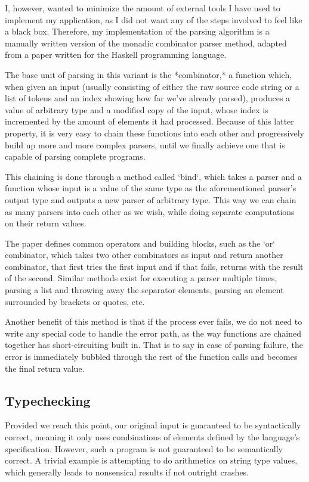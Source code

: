 \documentclass[conference]{IEEEtran}
\begin{document}
I, however, wanted to minimize the amount of external tools I have used to implement my application, as I did not want any of the steps involved to feel like a black box. Therefore, my implementation of the parsing algorithm is a manually written version of the monadic combinator parser method, adapted from a paper written for the Haskell programming language.

The base unit of parsing in this variant is the *combinator,* a function which, when given an input (usually consisting of either the raw source code string or a list of tokens and an index showing how far we've already parsed), produces a value of arbitrary type and a modified copy of the input, whose index is incremented by the amount of elements it had processed. Because of this latter property, it is very easy to chain these functions into each other and progressively build up more and more complex parsers, until we finally achieve one that is capable of parsing complete programs.

This chaining is done through a method called `bind`, which takes a parser and a function whose input is a value of the same type as the aforementioned parser's output type and outputs a new parser of arbitrary type. This way we can chain as many parsers into each other as we wish, while doing separate computations on their return values.

The paper defines common operators and building blocks, such as the `or` combinator, which takes two other combinators as input and return another combinator, that first tries the first input and if that fails, returns with the result of the second. Similar methods exist for executing a parser multiple times, parsing a list and throwing away the separator elements, parsing an element surrounded by brackets or quotes, etc.

Another benefit of this method is that if the process ever fails, we do not need to write any special code to handle the error path, as the way functions are chained together has short-circuiting built in. That is to say in case of parsing failure, the error is immediately bubbled through the rest of the function calls and becomes the final return value.

\subsection{Typechecking}

Provided we reach this point, our original input is guaranteed to be syntactically correct, meaning it only uses combinations of elements defined by the language's specification. However, such a program is not guaranteed to be semantically correct. A trivial example is attempting to do arithmetics on string type values, which generally leads to nonsensical results if not outright crashes.
\end{document}
